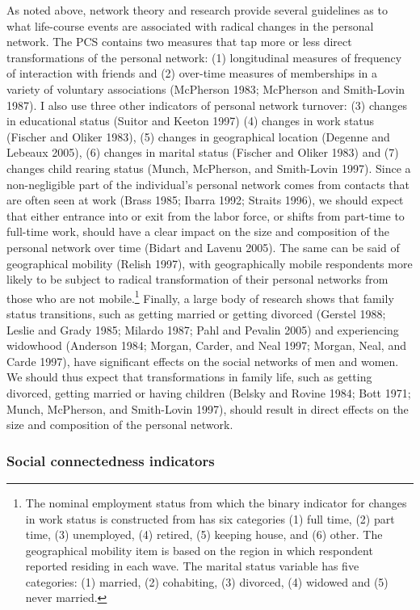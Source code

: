 As noted above, network theory and research provide several guidelines as to what life-course events are associated with radical changes in the personal network. The PCS contains two measures that tap more or less direct transformations of the personal network: (1) longitudinal measures of frequency of interaction with friends and (2) over-time measures of memberships in a variety of voluntary associations (McPherson 1983; McPherson and Smith-Lovin 1987). I also use three other indicators of personal network turnover: (3) changes in educational status (Suitor and Keeton 1997) (4) changes in work status (Fischer and Oliker 1983), (5) changes in geographical location (Degenne and Lebeaux 2005), (6) changes in marital status (Fischer and Oliker 1983) and (7) changes child rearing status (Munch, McPherson, and Smith-Lovin 1997). Since a non-negligible part of the individual's personal network comes from contacts that are often seen at work (Brass 1985; Ibarra 1992; Straits 1996), we should expect that either entrance into or exit from the labor force, or shifts from part-time to full-time work, should have a clear impact on the size and composition of the personal network over time (Bidart and Lavenu 2005). The same can be said of geographical mobility (Relish 1997), with geographically mobile respondents more likely to be subject to radical transformation of their personal networks from those who are not mobile.\footnote{The nominal employment status from which the binary indicator for changes in work status is constructed from has six categories (1) full time, (2) part time, (3) unemployed, (4) retired, (5) keeping house, and (6) other. The geographical mobility item is based on the region in which respondent reported residing in each wave. The marital status variable has five categories: (1) married, (2) cohabiting, (3) divorced, (4) widowed and (5) never married.} Finally, a large body of research shows that family status transitions, such as getting married or getting divorced (Gerstel 1988; Leslie and Grady 1985; Milardo 1987; Pahl and Pevalin 2005) and experiencing widowhood (Anderson 1984; Morgan, Carder, and Neal 1997; Morgan, Neal, and Carde 1997), have significant effects on the social networks of men and women. We should thus expect that transformations in family life, such as getting divorced, getting married or having children (Belsky and Rovine 1984; Bott 1971; Munch, McPherson, and Smith-Lovin 1997), should result in direct effects on the size and composition of the personal network.

\subsubsection{Social connectedness indicators}\label{social-connectedness-indicators}

